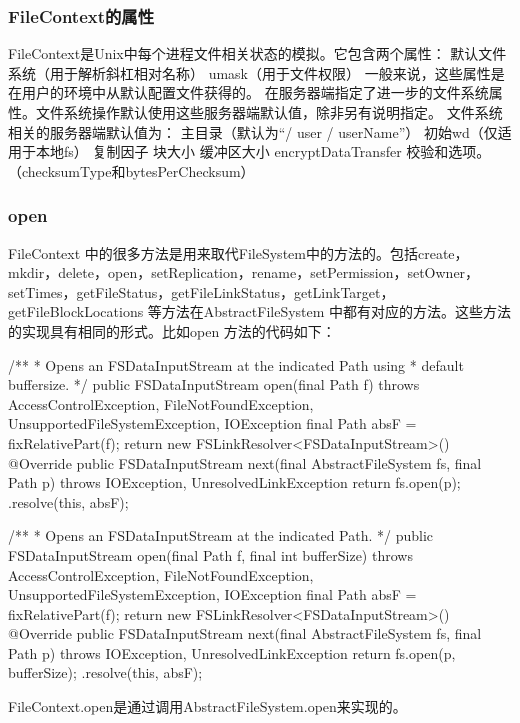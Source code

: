 \subsubsection{FileContext的属性}
FileContext是Unix中每个进程文件相关状态的模拟。它包含两个属性：
默认文件系统（用于解析斜杠相对名称）
umask（用于文件权限）
一般来说，这些属性是在用户的环境中从默认配置文件获得的。
在服务器端指定了进一步的文件系统属性。文件系统操作默认使用这些服务器端默认值，除非另有说明指定。
文件系统相关的服务器端默认值为：
主目录（默认为“/ user / userName”）
初始wd（仅适用于本地fs）
复制因子
块大小
缓冲区大小
encryptDataTransfer
校验和选项。 （checksumType和bytesPerChecksum）

\subsubsection{open}
FileContext 中的很多方法是用来取代FileSystem中的方法的。包括create，mkdir，delete，open，setReplication，rename，setPermission，setOwner，setTimes，getFileStatus，getFileLinkStatus，getLinkTarget，getFileBlockLocations 等方法在AbstractFileSystem 中都有对应的方法。这些方法的实现具有相同的形式。比如open 方法的代码如下：
\begin{java}
/**
   * Opens an FSDataInputStream at the indicated Path using
   * default buffersize.
   */
 public FSDataInputStream open(final Path f) throws AccessControlException,
      FileNotFoundException, UnsupportedFileSystemException, IOException {
    final Path absF = fixRelativePart(f);
    return new FSLinkResolver<FSDataInputStream>() {
      @Override
      public FSDataInputStream next(final AbstractFileSystem fs, final Path p)
        throws IOException, UnresolvedLinkException {
        return fs.open(p);
      }
    }.resolve(this, absF);
  }

  /**
   * Opens an FSDataInputStream at the indicated Path.
   */
  public FSDataInputStream open(final Path f, final int bufferSize)
      throws AccessControlException, FileNotFoundException,
      UnsupportedFileSystemException, IOException {
    final Path absF = fixRelativePart(f);
    return new FSLinkResolver<FSDataInputStream>() {
      @Override
      public FSDataInputStream next(final AbstractFileSystem fs, final Path p)
        throws IOException, UnresolvedLinkException {
        return fs.open(p, bufferSize);
      }
    }.resolve(this, absF);
  }
\end{java}
FileContext.open是通过调用AbstractFileSystem.open来实现的。

